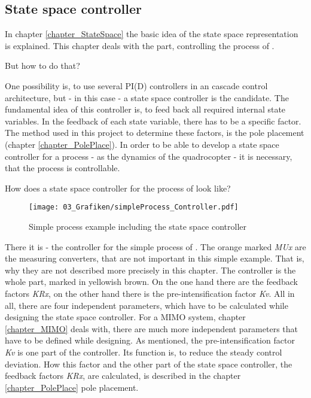 \subsection{State space controller}

In chapter \ref{chapter_StateSpace} the basic idea of the state space representation is explained. This chapter deals with the part, controlling the process of . 

But how to do that?

One possibility is, to use several PI(D) controllers in an cascade control architecture, but - in this case - a state space controller is the candidate. The fundamental idea of this controller is, to feed back all required internal state variables. In the feedback of each state variable, there has to be a specific factor. The method used in this project to determine these factors, is the pole placement (chapter \ref{chapter_PolePlace}). In order to be able to develop a state space controller for a process - as the dynamics of the quadrocopter - it is necessary, that the process is controllable.

How does a state space controller for the process of  look like?

\begin{figure}
	\centering
		\texttt{[image: 03\_Grafiken/simpleProcess\_Controller.pdf]}
	\caption{Simple process example including the state space controller}
	\label{fig:simpleProcess_Controller}
\end{figure}

There it is - the controller for the simple process of . The orange marked \textit{MUx} are the measuring converters, that are not important in this simple example. That is, why they are not described more precisely in this chapter. 
The controller is the whole part, marked in yellowish brown. On the one hand there are the feedback factors \textit{KRx}, on the other hand there is the pre-intensification factor \textit{Kv}. All in all, there are four independent parameters, which have to be calculated while designing the state space controller. For a MIMO system, chapter \ref{chapter_MIMO} deals with, there are much more independent parameters that have to be defined while designing.
As mentioned, the pre-intensification factor \textit{Kv} is one part of the controller. Its function is, to reduce the steady control deviation. How this factor and the other part of the state space controller, the feedback factors \textit{KRx}, are calculated, is described in the chapter \ref{chapter_PolePlace} pole placement.

